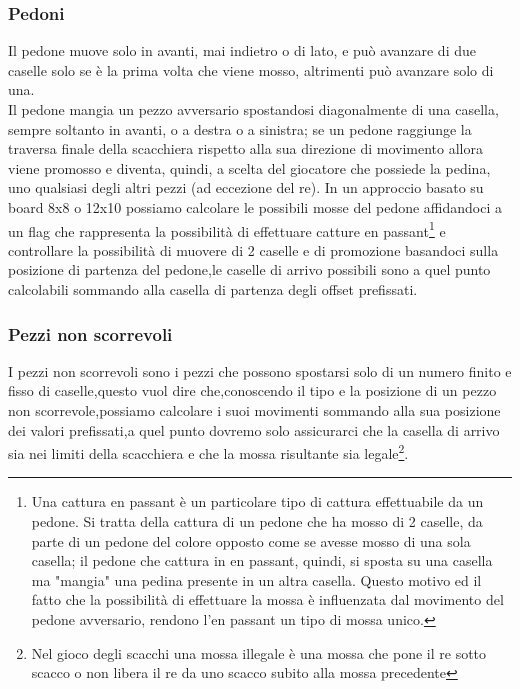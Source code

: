 \subsubsection{Pedoni}
Il pedone muove solo in avanti, mai indietro o di lato, e può avanzare  di due caselle solo se è la prima volta che viene mosso, altrimenti può avanzare solo di una.
\\Il pedone mangia un pezzo avversario spostandosi diagonalmente di una casella, sempre soltanto in avanti, o a destra o a sinistra; se un pedone raggiunge la traversa finale della scacchiera rispetto alla sua direzione di movimento
allora viene promosso e diventa, quindi, a scelta del giocatore che possiede la pedina, uno qualsiasi degli altri pezzi (ad eccezione del re).
In un approccio basato su board 8x8 o 12x10 possiamo calcolare le possibili mosse del pedone affidandoci a un flag che rappresenta la possibilità di effettuare catture en passant\footnote{
Una cattura en passant è un particolare tipo di cattura effettuabile da un pedone. Si tratta della cattura di un pedone che ha mosso di 2 caselle, da parte di un pedone del colore opposto come se avesse mosso di una sola casella; il pedone che cattura in en passant, quindi, si sposta su una casella ma "mangia" una pedina presente in un altra casella. Questo motivo ed il fatto che la possibilità di effettuare la mossa è influenzata dal movimento del pedone avversario, rendono l'en passant un tipo di mossa unico.} e controllare la possibilità 
di muovere di 2 caselle e di promozione basandoci sulla posizione di partenza del pedone,le caselle di arrivo possibili sono a quel punto calcolabili sommando alla casella di partenza degli offset prefissati.



\subsubsection{Pezzi non scorrevoli}
I pezzi non scorrevoli sono i pezzi che possono spostarsi solo di un numero finito e fisso di caselle,questo vuol dire che,conoscendo il tipo e la posizione di un pezzo non scorrevole,possiamo calcolare i suoi movimenti
sommando alla sua posizione dei valori prefissati,a quel punto dovremo solo assicurarci che la casella di arrivo sia nei limiti della scacchiera e che la mossa risultante sia legale\footnote{Nel gioco degli scacchi una mossa illegale è una mossa che pone il re sotto scacco o non libera il re da uno scacco subito alla mossa precedente}.

